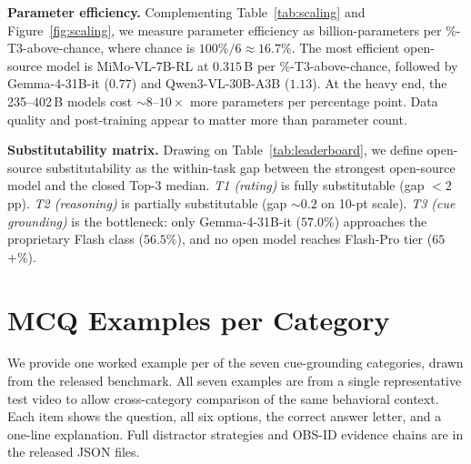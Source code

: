 \documentclass{llmxive}
\begin{document}
\noindent\textbf{Parameter efficiency.}
Complementing Table~\ref{tab:scaling} and Figure~\ref{fig:scaling}, we measure parameter efficiency as billion-parameters per \%-T3-above-chance, where chance is $100\%/6\!\approx\!16.7\%$. The most efficient open-source model is MiMo-VL-7B-RL at $0.315$\,B per \%-T3-above-chance, followed by Gemma-4-31B-it ($0.77$) and Qwen3-VL-30B-A3B ($1.13$). At the heavy end, the 235--402\,B models cost $\sim\!8$--$10\!\times$ more parameters per percentage point. Data quality and post-training appear to matter more than parameter count.

\noindent\textbf{Substitutability matrix.}
Drawing on Table~\ref{tab:leaderboard}, we define open-source substitutability as the within-task gap between the strongest open-source model and the closed Top-3 median. \emph{T1 (rating)} is fully substitutable (gap $<\!2$\,pp). \emph{T2 (reasoning)} is partially substitutable (gap $\sim\!0.2$ on 10-pt scale). \emph{T3 (cue grounding)} is the bottleneck: only Gemma-4-31B-it ($57.0\%$) approaches the proprietary Flash class ($56.5\%$), and no open model reaches Flash-Pro tier ($65$+\%).

\section{MCQ Examples per Category}
\label{app:mcq}

We provide one worked example per of the seven cue-grounding categories, drawn from the released benchmark. All seven examples are from a single representative test video to allow cross-category comparison of the same behavioral context. Each item shows the question, all six options, the correct answer letter, and a one-line explanation. Full distractor strategies and OBS-ID evidence chains are in the released JSON files.
\end{document}
